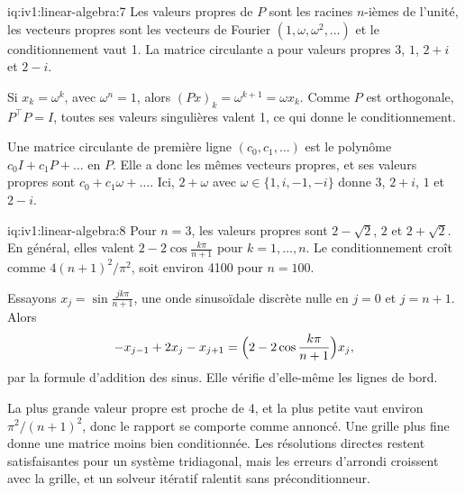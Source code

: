 \begin{solution}{iq:iv1:linear-algebra:7}
Les valeurs propres de $P$ sont les racines $n$-ièmes de l'unité, les vecteurs propres sont les vecteurs de Fourier $(1, \omega, \omega^2, \dots)$ et le conditionnement vaut 1. La matrice circulante a pour valeurs propres $3$, $1$, $2 + i$ et $2 - i$.

Si $x_k = \omega^k$, avec $\omega^n = 1$, alors $(Px)_k = \omega^{k + 1} = \omega x_k$. Comme $P$ est orthogonale, $P^\top P = I$, toutes ses valeurs singulières valent 1, ce qui donne le conditionnement.

Une matrice circulante de première ligne $(c_0, c_1, \dots)$ est le polynôme $c_0I + c_1P + \dots$ en $P$. Elle a donc les mêmes vecteurs propres, et ses valeurs propres sont $c_0 + c_1\omega + \dots$. Ici, $2 + \omega$ avec $\omega \in \{1, i, -1, -i\}$ donne $3$, $2 + i$, $1$ et $2 - i$.

\end{solution}

\begin{solution}{iq:iv1:linear-algebra:8}
Pour $n = 3$, les valeurs propres sont $2 - \sqrt{2}$, $2$ et $2 + \sqrt{2}$. En général, elles valent $2 - 2\cos\frac{k\pi}{n + 1}$ pour $k = 1, \dots, n$. Le conditionnement croît comme $4(n + 1)^2/\pi^2$, soit environ 4100 pour $n = 100$.

Essayons $x_j = \sin\frac{jk\pi}{n + 1}$, une onde sinusoïdale discrète nulle en $j = 0$ et $j = n + 1$. Alors
\[
-x_{j - 1} + 2x_j - x_{j + 1} = \Bigl(2 - 2\cos\frac{k\pi}{n + 1}\Bigr)x_j,
\]
par la formule d'addition des sinus. Elle vérifie d'elle-même les lignes de bord.

La plus grande valeur propre est proche de 4, et la plus petite vaut environ $\pi^2/(n + 1)^2$, donc le rapport se comporte comme annoncé. Une grille plus fine donne une matrice moins bien conditionnée. Les résolutions directes restent satisfaisantes pour un système tridiagonal, mais les erreurs d'arrondi croissent avec la grille, et un solveur itératif ralentit sans préconditionneur.

\end{solution}

